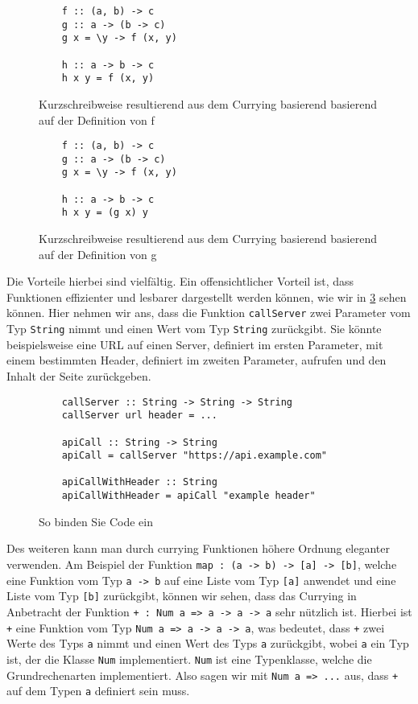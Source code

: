\documentclass{hhuarticle}
\theoremstyle{definition}
\theoremstyle{theorem}
\begin{document}
  \begin{figure}[h]
    \begin{lstlisting}
    f :: (a, b) -> c
    g :: a -> (b -> c)
    g x = \y -> f (x, y)

    h :: a -> b -> c
    h x y = f (x, y)
    \end{lstlisting}
    \caption{Kurzschreibweise resultierend aus dem Currying basierend basierend auf der Definition von f}%
    \label{fig:curryingf}
  \end{figure}

  \begin{figure}[h]
    \begin{lstlisting}
    f :: (a, b) -> c
    g :: a -> (b -> c)
    g x = \y -> f (x, y)

    h :: a -> b -> c
    h x y = (g x) y
    \end{lstlisting}
    \caption{Kurzschreibweise resultierend aus dem Currying basierend basierend auf der Definition von g}%
    \label{fig:curryingg}
  \end{figure}

  Die Vorteile hierbei sind vielfältig. Ein offensichtlicher Vorteil ist,
  dass Funktionen effizienter und lesbarer dargestellt werden können,
  wie wir in \cref{fig:curryingExample} sehen können. Hier nehmen wir
  ans, dass die Funktion \verb|callServer| zwei Parameter vom Typ \verb|String| nimmt
  und einen Wert vom Typ \verb|String| zurückgibt. Sie könnte beispielsweise
  eine URL auf einen Server, definiert im ersten Parameter, mit
  einem bestimmten Header, definiert im zweiten Parameter, aufrufen und
  den Inhalt der Seite zurückgeben.

  \begin{figure}[h]

    \begin{lstlisting}
    callServer :: String -> String -> String
    callServer url header = ...

    apiCall :: String -> String
    apiCall = callServer "https://api.example.com"

    apiCallWithHeader :: String
    apiCallWithHeader = apiCall "example header"
    \end{lstlisting}
    \caption{So binden Sie Code ein}%
    \label{fig:curryingExample}
  \end{figure}

  Des weiteren kann man durch currying Funktionen höhere Ordnung
  eleganter verwenden. Am Beispiel der Funktion \verb|map : (a -> b) -> [a] -> [b]|,
  welche eine Funktion vom Typ \verb|a -> b| auf eine Liste vom Typ \verb|[a]| anwendet
  und eine Liste vom Typ \verb|[b]| zurückgibt, können wir sehen, dass
  das Currying in Anbetracht der Funktion \verb|+ : Num a => a -> a -> a| sehr nützlich ist.
  Hierbei ist \verb|+| eine Funktion vom Typ \verb|Num a => a -> a -> a|,
  was bedeutet, dass \verb|+| zwei Werte des Typs \verb|a| nimmt und einen Wert
  des Typs \verb|a| zurückgibt, wobei \verb|a| ein Typ ist, der die Klasse \verb|Num| implementiert.
  \verb|Num| ist eine Typenklasse, welche die Grundrechenarten implementiert.
  Also sagen wir mit \verb|Num a => ...| aus, dass \verb|+| auf dem
  Typen \verb|a| definiert sein muss.
\end{document}
